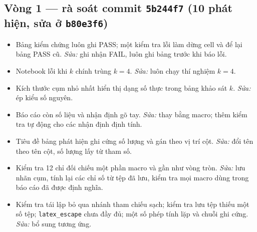 \documentclass[11pt,a4paper]{article}
\begin{document}
\subsection*{Vòng 1 — rà soát commit \texttt{5b244f7} (10 phát hiện, sửa ở \texttt{b80e3f6})}
\begin{itemize}
  \item Bảng kiểm chứng luôn ghi PASS; một kiểm tra lỗi làm dừng cell và để lại bảng PASS cũ. \emph{Sửa:} ghi nhận FAIL, luôn ghi bảng trước khi báo lỗi.
  \item Notebook lỗi khi $k$ chính trùng $k=4$. \emph{Sửa:} luôn chạy thí nghiệm $k=4$.
  \item Kích thước cụm nhỏ nhất hiển thị dạng số thực trong bảng khảo sát $k$. \emph{Sửa:} ép kiểu số nguyên.
  \item Báo cáo còn số liệu và nhận định gõ tay. \emph{Sửa:} thay bằng macro; thêm kiểm tra tự động cho các nhận định định tính.
  \item Tiêu đề bảng phát hiện ghi cứng số lượng và gán theo vị trí cột. \emph{Sửa:} đổi tên theo tên cột, số lượng lấy từ tham số.
  \item Kiểm tra 12 chỉ đối chiếu một phần macro và gần như vòng tròn. \emph{Sửa:} lưu nhãn cụm, tính lại các chỉ số từ tệp đã lưu, kiểm tra mọi macro dùng trong báo cáo đã được định nghĩa.
  \item Kiểm tra tái lập bỏ qua nhánh tham chiếu sạch; kiểm tra lưu tệp thiếu một số tệp; \texttt{latex\_escape} chưa đầy đủ; một số phép tính lặp và chuỗi ghi cứng. \emph{Sửa:} bổ sung tương ứng.
\end{itemize}
\end{document}
